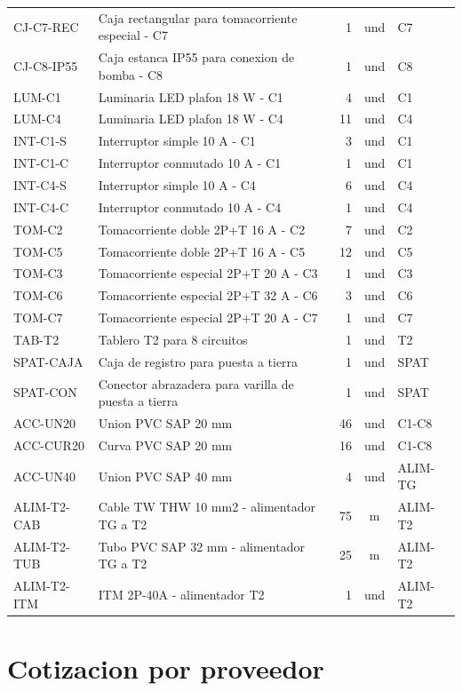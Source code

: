 \begin{landscape}
\begin{longtable}{p{1.7cm}p{9.0cm}r c p{1.8cm}}
CJ-C7-REC & Caja rectangular para tomacorriente especial - C7 & 1 & und & C7 \\
CJ-C8-IP55 & Caja estanca IP55 para conexion de bomba - C8 & 1 & und & C8 \\
LUM-C1 & Luminaria LED plafon 18 W - C1 & 4 & und & C1 \\
LUM-C4 & Luminaria LED plafon 18 W - C4 & 11 & und & C4 \\
INT-C1-S & Interruptor simple 10 A - C1 & 3 & und & C1 \\
INT-C1-C & Interruptor conmutado 10 A - C1 & 1 & und & C1 \\
INT-C4-S & Interruptor simple 10 A - C4 & 6 & und & C4 \\
INT-C4-C & Interruptor conmutado 10 A - C4 & 1 & und & C4 \\
TOM-C2 & Tomacorriente doble 2P+T 16 A - C2 & 7 & und & C2 \\
TOM-C5 & Tomacorriente doble 2P+T 16 A - C5 & 12 & und & C5 \\
TOM-C3 & Tomacorriente especial 2P+T 20 A - C3 & 1 & und & C3 \\
TOM-C6 & Tomacorriente especial 2P+T 32 A - C6 & 3 & und & C6 \\
TOM-C7 & Tomacorriente especial 2P+T 20 A - C7 & 1 & und & C7 \\
TAB-T2 & Tablero T2 para 8 circuitos & 1 & und & T2 \\
SPAT-CAJA & Caja de registro para puesta a tierra & 1 & und & SPAT \\
SPAT-CON & Conector abrazadera para varilla de puesta a tierra & 1 & und & SPAT \\
ACC-UN20 & Union PVC SAP 20 mm & 46 & und & C1-C8 \\
ACC-CUR20 & Curva PVC SAP 20 mm & 16 & und & C1-C8 \\
ACC-UN40 & Union PVC SAP 40 mm & 4 & und & ALIM-TG \\
ALIM-T2-CAB & Cable TW THW 10 mm2 - alimentador TG a T2 & 75 & m & ALIM-T2 \\
ALIM-T2-TUB & Tubo PVC SAP 32 mm - alimentador TG a T2 & 25 & m & ALIM-T2 \\
ALIM-T2-ITM & ITM 2P-40A - alimentador T2 & 1 & und & ALIM-T2 \\
\bottomrule\end{longtable}\normalsize\end{landscape}
\section{Cotizacion por proveedor}
